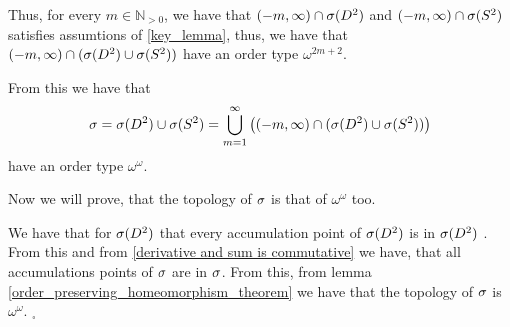 Thus, for every $m \in \mathbb{N}_{>0}$, we have that $(-m, \infty) \cap {{\sigma}(D^2)}$ and 
$(-m, \infty) \cap {{\sigma}(S^2)}$ satisfies assumtions of \ref{key_lemma}, thus, we have that 
$(-m, \infty) \cap ({{\sigma}(D^2)}\cup{{\sigma}(S^2)})$ have an order type $\omega^{2m+2}$. 

From this we have that 
\begin{equation}
{\sigma} = {{\sigma}(D^2)} \cup {{\sigma}(S^2)} = 
\bigcup\limits_{m=1}^\infty \left( (-m, \infty) \cap ({{\sigma}(D^2)}\cup{{\sigma}(S^2)}) \right)
\end{equation} 
have an order type $\omega^\omega$.

Now we will prove, that the topology of ${\sigma}$ is that of $\omega^\omega$ too.

We have that for ${{\sigma}(D^2)}$ \rba{$\speS$} that every accumulation point of 
${{\sigma}(D^2)}$ \rba{$\speS$} is in ${{\sigma}(D^2)}$ \rba{$\speS$}. From this and from 
\ref{derivative and sum is commutative} we have, that all accumulations points of ${\sigma}$ 
are in ${\sigma}$. From this, from lemma \ref{order_preserving_homeomorphism_theorem} we have 
that the topology of ${\sigma}$ is $\omega^\omega$. $_\square$ 








